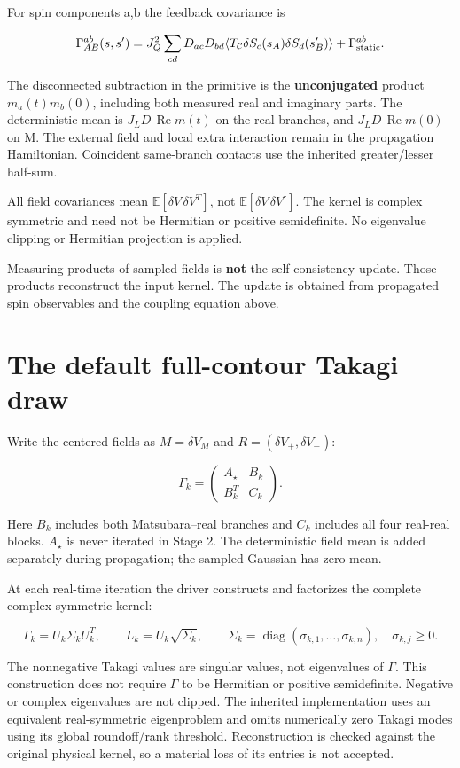 \documentclass[11pt,a4paper]{article}
\begin{document}
For spin components a,b the feedback covariance is

\[
\Gamma^{ab}_{AB}(s,s')=J_Q^2\sum_{cd}D_{ac}D_{bd}
 \langle T_{\mathcal C}\delta S_c(s_A)\delta S_d(s'_B)\rangle
 +\Gamma^{ab}_{\rm static}.
\]

The disconnected subtraction in the primitive is the \textbf{unconjugated} product \(m_a(t)m_b(0)\), including both measured real and imaginary parts. The deterministic mean is \(J_LD\,\operatorname{Re}m(t)\) on the real branches, and \(J_LD\,\operatorname{Re}m(0)\) on M. The external field and local extra interaction remain in the propagation Hamiltonian. Coincident same-branch contacts use the inherited greater/lesser half-sum.

All field covariances mean \(\mathbb E[\delta V\,\delta V^T]\), not \(\mathbb E[\delta V\,\delta V^\dagger]\). The kernel is complex symmetric and need not be Hermitian or positive semidefinite. No eigenvalue clipping or Hermitian projection is applied.

Measuring products of sampled fields is \textbf{not} the self-consistency update. Those products reconstruct the input kernel. The update is obtained from propagated spin observables and the coupling equation above.

\section{The default full-contour Takagi draw}

Write the centered fields as \(M=\delta V_M\) and \(R=(\delta V_+,\delta V_-)\):

\[
\Gamma_k=\begin{pmatrix}A_\star&B_k\\B_k^T&C_k\end{pmatrix}.
\]

Here \(B_k\) includes both Matsubara–real branches and \(C_k\) includes all four real-real blocks. \(A_\star\) is never iterated in Stage 2. The deterministic field mean is added separately during propagation; the sampled Gaussian has zero mean.

At each real-time iteration the driver constructs and factorizes the complete complex-symmetric kernel:

\[
\Gamma_k=U_k\Sigma_k U_k^T,\qquad
L_k=U_k\sqrt{\Sigma_k},\qquad
\Sigma_k=\operatorname{diag}(\sigma_{k,1},\ldots,\sigma_{k,n}),\quad
\sigma_{k,j}\geq0.
\]

The nonnegative Takagi values are singular values, not eigenvalues of \(\Gamma\). This construction does not require \(\Gamma\) to be Hermitian or positive semidefinite. Negative or complex eigenvalues are not clipped. The inherited implementation uses an equivalent real-symmetric eigenproblem and omits numerically zero Takagi modes using its global roundoff/rank threshold. Reconstruction is checked against the original physical kernel, so a material loss of its entries is not accepted.
\end{document}
